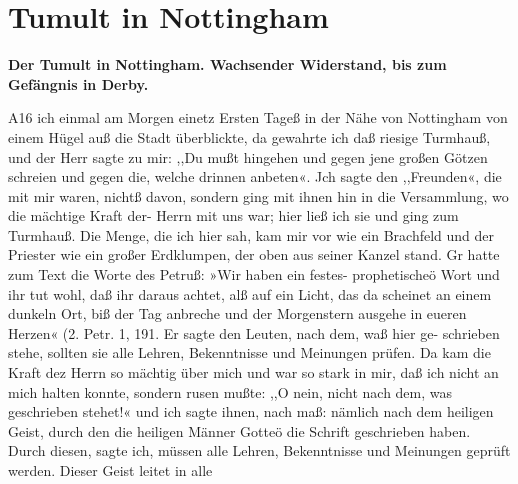 \chapter[Tumult in Nottingham]{Tumult in Nottingham}

\begin{center}
\textbf{Der Tumult in Nottingham. Wachsender Widerstand, bis zum
Gefängnis in Derby.}
\end{center}


A16 ich einmal am Morgen einetz Ersten Tageß in der Nähe
von Nottingham von einem Hügel auß die Stadt überblickte, da
gewahrte ich daß riesige Turmhauß, und der Herr sagte zu mir:
,,Du mußt hingehen und gegen jene großen Götzen schreien und
gegen die, welche drinnen anbeten«. Jch sagte den ,,Freunden«,
die mit mir waren, nichtß davon, sondern ging mit ihnen hin in
die Versammlung, wo die mächtige Kraft der- Herrn mit uns
war; hier ließ ich sie und ging zum Turmhauß. Die Menge,
die ich hier sah, kam mir vor wie ein Brachfeld und der Priester
wie ein großer Erdklumpen, der oben aus seiner Kanzel stand.
Gr hatte zum Text die Worte des Petruß: »Wir haben ein festes-
prophetischeö Wort und ihr tut wohl, daß ihr daraus achtet, alß
auf ein Licht, das da scheinet an einem dunkeln Ort, biß der Tag
anbreche und der Morgenstern ausgehe in eueren Herzen«
(2. Petr. 1, 191. Er sagte den Leuten, nach dem, waß hier ge-
schrieben stehe, sollten sie alle Lehren, Bekenntnisse und Meinungen
prüfen. Da kam die Kraft dez Herrn so mächtig über mich und
war so stark in mir, daß ich nicht an mich halten konnte, sondern
rusen mußte: ,,O nein, nicht nach dem, was geschrieben stehet!«
und ich sagte ihnen, nach maß: nämlich nach dem heiligen Geist,
durch den die heiligen Männer Gotteö die Schrift geschrieben
haben. Durch diesen, sagte ich, müssen alle Lehren, Bekenntnisse
und Meinungen geprüft werden. Dieser Geist leitet in alle


